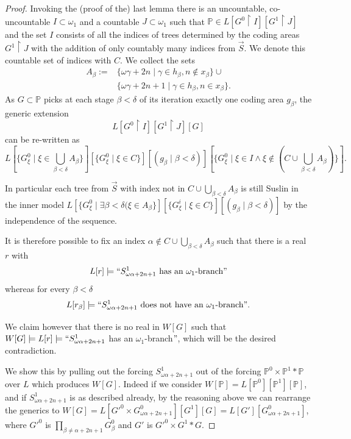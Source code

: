 \documentclass[a4paper,11pt]{article}
\newcommand{\forceP}{\mathbb{P}}
\begin{document}
\begin{proof}
Invoking the (proof of the) last lemma there is an uncountable, co-uncountable $I \subset \omega_1$ and 
a countable $J \subset \omega_1$ such that $\forceP \in L[G^0 \upharpoonright I][G^1 \upharpoonright J]$ and the set $I$ consists of all the indices of trees determined by the coding areas $G^1 \upharpoonright J$ with the addition of only countably many indices from $\vec{S}$. We denote this countable set of indices with $C$.
We collect the sets \begin{align*}
A_{\beta}:= &\{ \omega \gamma +2n \mid \gamma \in h_{\beta}, n \notin x_{\beta} \} \cup \\& \{\omega \gamma + 2n+1 \mid \gamma \in h_{\beta}, n \in x_{\beta} \}.
\end{align*}
As $G \subset \forceP$ picks at each stage $\beta < \delta$ of its iteration exactly one coding area $g_{\beta}$, the generic extension \[L[G^0 \upharpoonright I]  [G^1 \upharpoonright J] [ G]\] can be re-written as
\[ L [\{G^0_{\xi} \mid \xi \in \bigcup_{\beta < \delta}  A_{\beta} \} ][\{G^0_{\xi} \mid \xi \in C\}][(g_{\beta} \mid \beta  < \delta)] [\{ G^0_{\xi } \mid \xi \in I \land \xi \notin (C \cup \bigcup_{\beta <\delta} A_{\beta} ) \}].\]

In particular each tree from $\vec{S}$ with index not in  $C \cup \bigcup_{\beta <\delta} A_{\beta}$ is still Suslin in the inner model $L [\{G^0_{\xi} \mid \exists \beta < \delta (\xi \in A_{\beta} \} ][\{G^i_{\xi} \mid \xi \in C\}][(g_{\beta} \mid \beta  < \delta)]$ by the independence of the sequence.


It is therefore possible to fix an index $\alpha \notin C \cup \bigcup_{\beta <\delta} A_{\beta}$ such that there is a real $r$ with \[L[r] \models ``S^1_{\omega \alpha + 2n+1} \text{ has an $\omega_1$-branch}"\] whereas for every $\beta < \delta$
\[L[r_{\beta}] \models  ``S^1_{\omega \alpha + 2n+1} \text{ does not have an $\omega_1$-branch}".\]



We claim however  that there is no real in $W[G]$ such that $W[G] \models L[r] \models ``S^1_{\omega \alpha + 2n+1}$ has an $\omega_1$-branch$"$, which will be the desired contradiction.


We show this by pulling out the forcing $S^1_{\omega \alpha + 2n+1}$ out of the forcing $\forceP^0 \times \forceP^1 \ast \forceP$ over $L$ which produces $W[G]$. 
Indeed if we consider $W[\forceP]=L[\forceP^0] [\forceP^1][\forceP]$, and if $S^1_{\omega \alpha + 2n+1}$ is as described already, by the reasoning above
we can rearrange the generics to $W[G]= L  [G'^0 \times G^0_{\omega \alpha + 2n+1} ] [G^1] [G] = L[G'] [G^0_{\omega \alpha + 2n+1} ]$, where $G'^0$ is $\prod_{\beta \ne \alpha+2n+1}  G^0_{\beta}$ and $G'$ is $G'^0 \times G^1 \ast G$.


\end{proof}
\end{document}
